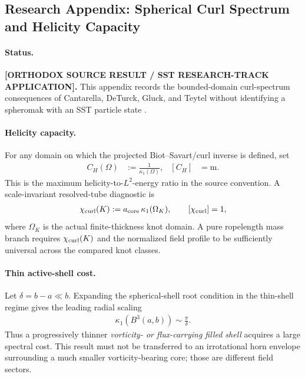 \subsection{Research Appendix: Spherical Curl Spectrum and Helicity Capacity}
    \label{subsec:rt_spherical_curl_spectrum_capacity}

    \paragraph{Status.}
    \textbf{[ORTHODOX SOURCE RESULT / SST RESEARCH-TRACK APPLICATION].}
    This appendix records the bounded-domain curl-spectrum consequences of
    Cantarella, DeTurck, Gluck, and Teytel without identifying a spheromak with an
    SST particle state
    \cite{CantarellaDeTurckGluckTeytel2000CurlSpherical}.

    \paragraph{Helicity capacity.}
    For any domain on which the projected Biot--Savart/curl inverse is defined, set
    \begin{align}
        C_H(\Omega)
        &:=
        \frac{1}{\kappa_1(\Omega)},
        &
        [C_H]&=\mathrm{m}.
        \label{eq:rt_helicity_capacity}
    \end{align}
    This is the maximum helicity-to-\(L^2\)-energy ratio in the source convention.
    A scale-invariant resolved-tube diagnostic is
    \begin{align}
        \chi_{\rm curl}(K)
        :=
        a_{\rm core}\,\kappa_1(\Omega_K),
        \qquad
        [\chi_{\rm curl}]=1,
        \label{eq:rt_chi_curl}
    \end{align}
    where \(\Omega_K\) is the actual finite-thickness knot domain.  A pure
    ropelength mass branch requires \(\chi_{\rm curl}(K)\) and the normalized field
    profile to be sufficiently universal across the compared knot classes.

    \paragraph{Thin active-shell cost.}
    Let \(\delta=b-a\ll b\).  Expanding the spherical-shell root condition in the
    thin-shell regime gives the leading radial scaling
    \begin{align}
        \kappa_1(B^3(a,b))
        \sim
        \frac{\pi}{\delta}.
        \label{eq:rt_thin_shell_curl_scaling}
    \end{align}
    Thus a progressively thinner \emph{vorticity- or flux-carrying filled shell}
    acquires a large spectral cost.  This result must not be transferred to an
    irrotational horn envelope surrounding a much smaller vorticity-bearing core;
    those are different field sectors.

